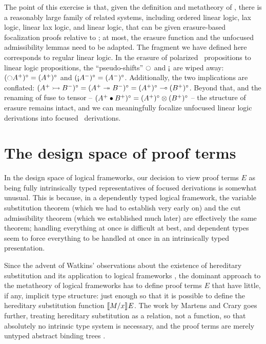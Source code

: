 The point of this exercise is that, given the definition and
metatheory of \ollll, there is a reasonably large family of related
systems, including ordered linear logic, lax logic, linear lax logic, and
linear logic, that can be given erasure-based focalization proofs
relative to \ollll; at most, the erasure function and the unfocused
admissibility lemmas need to be adapted. The fragment we have defined
here corresponds to regular linear logic. In the erasure of polarized
\ollll~propositions to linear logic propositions, the
``pseudo-shifts'' ${\ocircle}$ and ${\gnab}$ are wiped away:
$({\ocircle}A^+)^\circ = (A^+)^\circ$ and $({\gnab}A^-)^\circ =
(A^-)^\circ$.  Additionally, the two implications are conflated: $(A^+
\rightarrowtail B^-)^\circ = (A^+ \twoheadrightarrow B^-)^\circ = (A^+)^\circ \multimap
(B^+)^\circ$. Beyond that, and the renaming of fuse to tensor -- $(A^+
\mathbin{\bullet} B^+)^\circ = (A^+)^\circ \otimes (B^+)^\circ$ -- the structure
of erasure remains intact, and we can 
meaningfully focalize unfocused linear logic derivations into focused 
\ollll~derivations.

\section{The design space of proof terms}
\label{sec:intrinsic-extrinsic}

In the design space of logical frameworks, our decision to view
proof terms $E$ as being fully intrinsically typed representatives
of focused derivations is somewhat unusual. This is because, in 
a dependently typed logical framework, the variable substitution
theorem (which we had to establish very early on) and the cut 
admissibility theorem (which we established much later) are effectively
the same theorem; handling everything at once is difficult at best,
and dependent types seem to force everything to be handled at once in
an intrinsically typed presentation.

Since the advent of Watkins' observations about the existence of
hereditary substitution and its application to logical frameworks
\cite{watkins02concurrent}, the dominant approach to the metatheory of
logical frameworks has to define proof terms $E$ that have little, if
any, implicit type structure: just enough so that
it is possible to define the hereditary substitution function
$\llbracket {M}/{x} \rrbracket^{} {E}$. The work by Martens and Crary goes further,
treating hereditary substitution as a relation, not a function, so
that absolutely no intrinsic type system is necessary, and the proof
terms are merely untyped abstract binding trees
\cite{martens12lf}.

